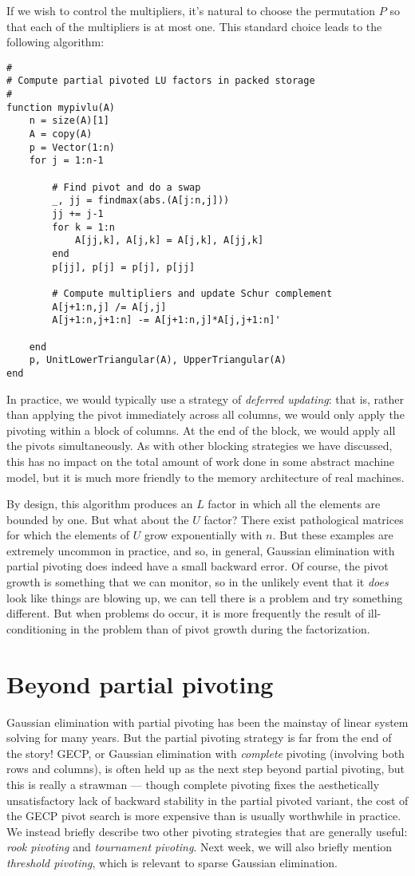 \documentclass[12pt, leqno]{article} %
\begin{document}
If we wish to control the multipliers, it's natural to choose
the permutation $P$ so that each of the multipliers is at most one.
This standard choice leads to the following algorithm:
\begin{lstlisting}
#
# Compute partial pivoted LU factors in packed storage
#
function mypivlu(A)
    n = size(A)[1]
    A = copy(A)
    p = Vector(1:n)
    for j = 1:n-1

        # Find pivot and do a swap
        _, jj = findmax(abs.(A[j:n,j]))
        jj += j-1
        for k = 1:n
            A[jj,k], A[j,k] = A[j,k], A[jj,k]
        end
        p[jj], p[j] = p[j], p[jj]

        # Compute multipliers and update Schur complement
        A[j+1:n,j] /= A[j,j]
        A[j+1:n,j+1:n] -= A[j+1:n,j]*A[j,j+1:n]'

    end
    p, UnitLowerTriangular(A), UpperTriangular(A)
end
\end{lstlisting}
In practice, we would typically use a strategy of
{\em deferred updating}: that is, rather than applying the
pivot immediately across all columns, we would only apply
the pivoting within a block of columns.  At the end of the
block, we would apply all the pivots simultaneously.  As with
other blocking strategies we have discussed, this has no impact
on the total amount of work done in some abstract machine model,
but it is much more friendly to the memory architecture of real
machines.

By design, this algorithm produces an $L$ factor in which all the
elements are bounded by one.  But what about the $U$ factor?  There
exist pathological matrices for which the elements of $U$ grow
exponentially with $n$.  But these examples are extremely uncommon in
practice, and so, in general, Gaussian elimination with partial
pivoting does indeed have a small backward error.  Of course, the
pivot growth is something that we can monitor, so in the unlikely event
that it {\em does} look like things are blowing up, we can tell there
is a problem and try something different.
But when problems do occur, it is more frequently the result of
ill-conditioning in the problem than of pivot growth during the
factorization.

\section{Beyond partial pivoting}

Gaussian elimination with partial pivoting has been the mainstay of
linear system solving for many years.  But the partial pivoting
strategy is far from the end of the story!  GECP, or Gaussian elimination
with {\em complete} pivoting (involving both rows and columns),
is often held up as the next step beyond partial pivoting,
but this is really a strawman --- though complete pivoting fixes
the aesthetically unsatisfactory lack of backward stability in the
partial pivoted variant, the cost of the GECP pivot search is
more expensive than is usually worthwhile in practice.  We instead
briefly describe two other pivoting strategies that are generally
useful: {\em rook pivoting} and {\em tournament pivoting}.  Next week,
we will also briefly mention {\em threshold pivoting}, which is relevant
to sparse Gaussian elimination.
\end{document}
